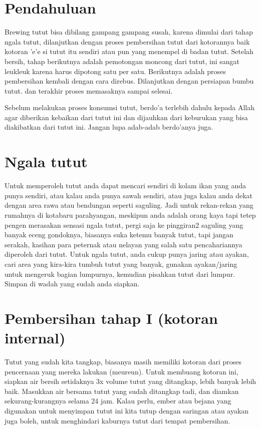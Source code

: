 \documentclass[a4paper]{article}
\begin{document}
\begin{multicols}{2}
\section{Pendahuluan}
Brewing tutut bisa dibilang gampang gampang susah, karena dimulai dari tahap ngala tutut, dilanjutkan dengan proses pembersihan tutut dari kotorannya baik kotoran 'e'e si tutut itu sendiri atau pun yang menempel di badan tutut. Setelah bersih, tahap berikutnya adalah pemotongan moncong dari tutut, ini sangat leukleuk karena harus dipotong satu per satu. Berikutnya adalah proses pembersihan kembali dengan cara direbus. Dilanjutkan dengan persiapan bumbu tutut. dan terakhir proses memasaknya sampai selesai.

Sebelum melakukan proses konsumsi tutut, berdo'a terlebih dahulu kepada Allah agar diberikan kebaikan dari tutut ini dan dijauhkan dari keburukan yang bisa diakibatkan dari tutut ini. Jangan lupa adab-adab berdo'anya juga.

\section{Ngala tutut}
Untuk memperoleh tutut anda dapat mencari sendiri di kolam ikan yang anda punya sendiri, atau kalau anda punya sawah sendiri, atau juga kalau anda dekat dengan area rawa atau bendungan seperti saguling. Jadi untuk rekan-rekan yang rumahnya di kotabaru parahyangan, meskipun anda adalah orang kaya tapi tetep pengen merasakan sensasi ngala tutut, pergi saja ke pinggiran2 saguling yang banyak eceng gondoknya, biasanya suka ketemu banyak tutut, tapi jangan serakah, kasihan para peternak atau nelayan yang salah satu pencahariannya diperoleh dari tutut. Untuk ngala tutut, anda cukup punya jaring atau ayakan, cari area yang kira-kira tumbuh tutut yang banyak, gunakan ayakan/jaring untuk mengeruk bagian lumpurnya, kemudian pisahkan tutut dari lumpur. Simpan di wadah yang sudah anda siapkan.

\section{Pembersihan tahap I (kotoran internal)}
Tutut yang sudah kita tangkap, biasanya masih memiliki kotoran dari proses pencernaan yang mereka lakukan (meureun). Untuk membuang kotoran ini, siapkan air bersih setidaknya 3x volume tutut yang ditangkap, lebih banyak lebih baik. Masukkan air bersama tutut yang sudah ditangkap tadi, dan diamkan sekurang-kurangnya selama 24 jam. Kalau perlu, ember atau bejana yang digunakan untuk menyimpan tutut ini kita tutup dengan saringan atau ayakan juga boleh, untuk menghindari kaburnya tutut dari tempat pembersihan.


\end{multicols}
\end{document}
